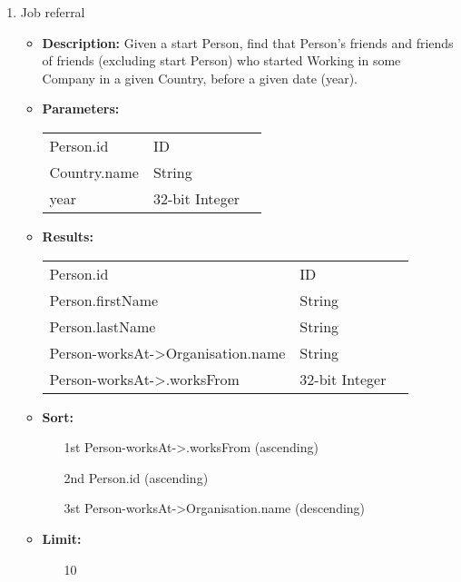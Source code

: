 {\begin{enumerate}
    \item Job referral
        \begin{itemize}
            \item \textbf{Description:}
                Given a start Person, find that Person's friends and friends of
                friends (excluding start Person) who started Working in some
                Company in a given Country, before a given date (year).
            \item \textbf{Parameters:} \\
                \begin{tabular}{lll}
                    Person.id 	 				& ID & \parbox[t]{20cm}{\par \strut} \\
                    Country.name 	 			& String & \parbox[t]{20cm}{\par \strut} \\
                    year 		 				& 32-bit Integer & \parbox[t]{20cm}{\par \strut} \\
                \end{tabular}
            \item \textbf{Results:} \\
                \begin{tabular}{lll}
                    Person.id 	 						& ID & \parbox[t]{20cm}{\par \strut} \\
                    Person.firstName 	 				& String & \parbox[t]{20cm}{\par \strut} \\
                    Person.lastName 	 				& String & \parbox[t]{20cm}{\par \strut} \\
                    Person-worksAt->Organisation.name 	& String & \parbox[t]{20cm}{\par \strut} \\
                    Person-worksAt->.worksFrom 	 		& 32-bit Integer & \parbox[t]{20cm}{\par \strut} \\
                \end{tabular}
            \item \textbf{Sort:}
                  \begin{itemize}
                    \item[1st] Person-worksAt->.worksFrom (ascending)
                    \item[2nd] Person.id (ascending)
                    \item[3st] Person-worksAt->Organisation.name (descending)
                  \end{itemize}
            \item \textbf{Limit:}
                  \begin{itemize}
                    \item[] 10
                  \end{itemize}
        \end{itemize}


\end{enumerate}}
